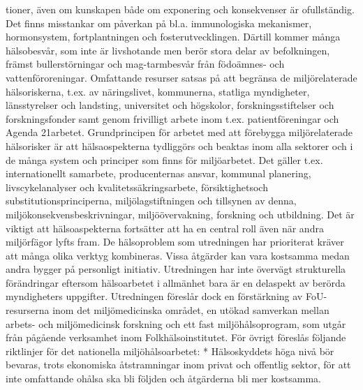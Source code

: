tioner, även om kunskapen både om exponering och konsekvenser är ofullständig. Det finns misstankar om påverkan på bl.a. immunologiska mekanismer, hormonsystem, fortplantningen och fosterutvecklingen.
Därtill kommer många hälsobesvår, som inte är livshotande men berör stora delar av befolkningen, främst bullerstörningar och mag-tarmbesvår från födoämnes- och vattenföroreningar.
Omfattande resurser satsas på att begränsa de miljörelaterade hälsoriskerna, t.ex. av näringslivet, kommunerna, statliga myndigheter, länsstyrelser och landsting, universitet och högskolor, forskningsstiftelser och forskningsfonder samt genom frivilligt arbete inom t.ex. patientföreningar och Agenda 21arbetet.
Grundprincipen för arbetet med att förebygga miljörelaterade hälsorisker är att hälsaospekterna tydliggörs och beaktas inom alla sektorer och i de många system och principer som finns för miljöarbetet. Det gäller t.ex. internationellt samarbete, producenternas ansvar, kommunal planering, livscykelanalyser och kvalitetssäkringsarbete, försiktighetsoch substitutionsprinciperna, miljölagstiftningen och tillsynen av denna, miljökonsekvensbeskrivningar, miljöövervakning, forskning och utbildning. Det är viktigt att hälsoaspekterna fortsätter att ha en central roll även när andra miljörfägor lyfts fram. De hälsoproblem som utredningen har prioriterat kräver att många olika verktyg kombineras. Vissa åtgärder kan vara kostsamma medan andra bygger på personligt initiativ.
Utredningen har inte övervägt strukturella förändringar eftersom hälsoarbetet i allmänhet bara är en delaspekt av berörda myndigheters uppgifter. Utredningen föreslår dock en förstärkning av FoU-resurserna inom det miljömedicinska området, en utökad samverkan mellan arbets- och miljömedicinsk forskning och ett fast miljöhålsoprogram, som utgår från pågående verksamhet inom Folkhälsoinstitutet.
För övrigt föreslås följande riktlinjer för det nationella miljöhålsoarbetet:
* Hälsoskyddets höga nivå bör bevaras, trots ekonomiska åtstramningar inom privat och offentlig sektor, för att inte omfattande ohålsa ska bli följden och åtgärderna bli mer kostsamma.

